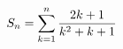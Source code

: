 \documentclass[preview]{standalone}
\begin{document}
\begin{align*}
\special{dvisvgm:raw <g id='unique000'>}S_n=\sum_{k=1}^{n}\frac{2k+1}{k^2+k+1}\special{dvisvgm:raw </g>}
\end{align*}
\end{document}
